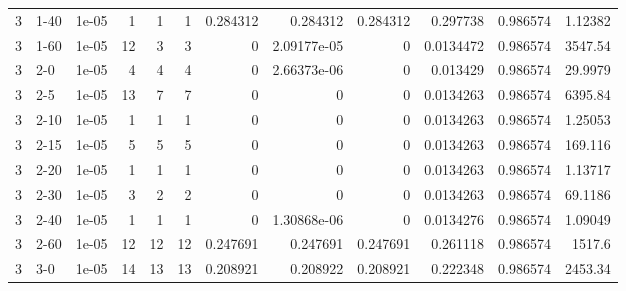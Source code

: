 \begin{tabular}{rlrrrrrrrrrr}
     3 & 1-40   &      1e-05 &           1 &                 1 &                 1 &     0.284312    &     0.284312    &      0.284312    &        0.297738  &               0.986574 &           1.12382  \\
     3 & 1-60   &      1e-05 &          12 &                 3 &                 3 &     0           &     2.09177e-05 &      0           &        0.0134472 &               0.986574 &        3547.54     \\
     3 & 2-0    &      1e-05 &           4 &                 4 &                 4 &     0           &     2.66373e-06 &      0           &        0.013429  &               0.986574 &          29.9979   \\
     3 & 2-5    &      1e-05 &          13 &                 7 &                 7 &     0           &     0           &      0           &        0.0134263 &               0.986574 &        6395.84     \\
     3 & 2-10   &      1e-05 &           1 &                 1 &                 1 &     0           &     0           &      0           &        0.0134263 &               0.986574 &           1.25053  \\
     3 & 2-15   &      1e-05 &           5 &                 5 &                 5 &     0           &     0           &      0           &        0.0134263 &               0.986574 &         169.116    \\
     3 & 2-20   &      1e-05 &           1 &                 1 &                 1 &     0           &     0           &      0           &        0.0134263 &               0.986574 &           1.13717  \\
     3 & 2-30   &      1e-05 &           3 &                 2 &                 2 &     0           &     0           &      0           &        0.0134263 &               0.986574 &          69.1186   \\
     3 & 2-40   &      1e-05 &           1 &                 1 &                 1 &     0           &     1.30868e-06 &      0           &        0.0134276 &               0.986574 &           1.09049  \\
     3 & 2-60   &      1e-05 &          12 &                12 &                12 &     0.247691    &     0.247691    &      0.247691    &        0.261118  &               0.986574 &        1517.6      \\
     3 & 3-0    &      1e-05 &          14 &                13 &                13 &     0.208921    &     0.208922    &      0.208921    &        0.222348  &               0.986574 &        2453.34     \\

\end{tabular}
